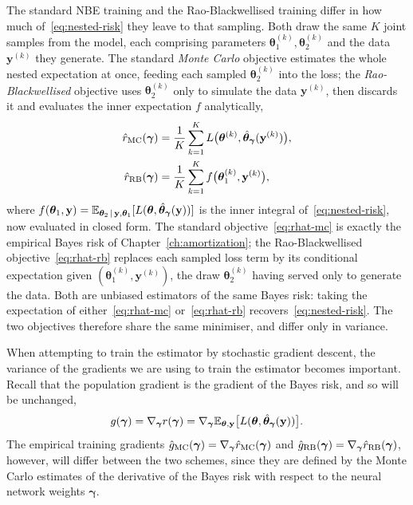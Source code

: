 The standard NBE training and the Rao-Blackwellised training differ in how much of~\eqref{eq:nested-risk}
they leave to that sampling. Both draw the same $K$ joint samples from
the model, each comprising parameters $\bm{\theta}_1^{(k)},
\bm{\theta}_2^{(k)}$ and the data $\mathbf{y}^{(k)}$ they generate.
The standard \emph{Monte Carlo} objective estimates the whole nested
expectation at once, feeding each sampled $\bm{\theta}_2^{(k)}$ into
the loss; the \emph{Rao-Blackwellised} objective uses
$\bm{\theta}_2^{(k)}$ only to simulate the data $\mathbf{y}^{(k)}$,
then discards it and evaluates the inner expectation $f$
analytically,
%
\begin{align}
  \hat{r}_{\mathrm{MC}}(\bm{\gamma})
  &= \frac{1}{K}\sum_{k=1}^{K}
     L\big(\bm{\theta}^{(k)},
     \hat{\bm{\theta}}_{\bm{\gamma}}(\mathbf{y}^{(k)})\big),
  \label{eq:rhat-mc} \\
  \hat{r}_{\mathrm{RB}}(\bm{\gamma})
  &= \frac{1}{K}\sum_{k=1}^{K}
     f\big(\bm{\theta}_1^{(k)}, \mathbf{y}^{(k)}\big),
  \label{eq:rhat-rb}
\end{align}
%
where $f(\bm{\theta}_1, \mathbf{y}) =
\mathbb{E}_{\bm{\theta}_2 \,|\, \mathbf{y}, \bm{\theta}_1}
[L(\bm{\theta}, \hat{\bm{\theta}}_{\bm{\gamma}}(\mathbf{y}))]$ is the
inner integral of~\eqref{eq:nested-risk}, now evaluated in closed
form. The standard objective~\eqref{eq:rhat-mc} is exactly the
empirical Bayes risk of Chapter~\ref{ch:amortization}; the
Rao-Blackwellised
objective~\eqref{eq:rhat-rb} replaces each sampled loss term by its
conditional expectation given $(\bm{\theta}_1^{(k)},\mathbf{y}^{(k)})$, the draw $\bm{\theta}_2^{(k)}$ having served
only to generate the data. Both are unbiased estimators of the same
Bayes risk: taking the expectation of
either~\eqref{eq:rhat-mc} or~\eqref{eq:rhat-rb}
recovers~\eqref{eq:nested-risk}. The two objectives therefore share
the same minimiser, and differ only in variance.

When attempting to train the estimator by stochastic gradient descent, the variance of
the gradients we are using to train the estimator becomes important. Recall that the population gradient is the gradient of the Bayes risk, and so will be unchanged,
%
\begin{equation}
  g(\bm{\gamma}) = \nabla_{\bm{\gamma}} r(\bm{\gamma})
  = \nabla_{\bm{\gamma}} \mathbb{E}_{\bm{\theta}, \mathbf{y}}
    \big[ L(\bm{\theta}, \hat{\bm{\theta}}_{\bm{\gamma}}(\mathbf{y})) \big].
\end{equation}
%
The empirical training gradients $\hat{g}_{\mathrm{MC}}(\bm{\gamma})= \nabla_{\bm{\gamma}} \hat{r}_{\mathrm{MC}}(\bm{\gamma})$ and $\hat{g}_{\mathrm{RB}}(\bm{\gamma})= \nabla_{\bm{\gamma}} \hat{r}_{\mathrm{RB}}(\bm{\gamma})$, however, will differ between the two schemes, since they
are defined by the Monte Carlo estimates of the derivative of the Bayes risk with respect
to the neural network weights $\bm{\gamma}$.

